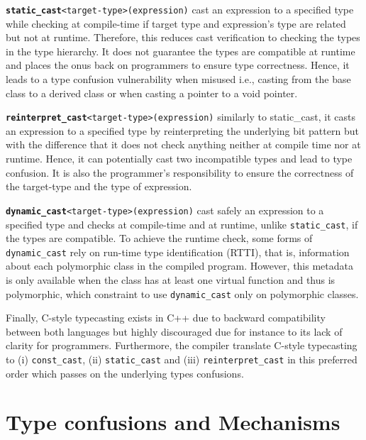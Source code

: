 \documentclass[a4paper,11pt,oneside]{report}
\begin{document}
\texttt{\textbf{static\_cast}<target-type>(expression)} cast an expression to a
specified type while checking at compile-time if target type and expression's 
type are related but not at runtime. Therefore, this
reduces cast verification to checking the types in the type hierarchy. It does
not guarantee the types are compatible at runtime and places the onus back on
programmers to ensure type correctness. Hence, it leads to a type confusion
vulnerability when misused i.e., casting from the base class to a derived class
or when casting a pointer to a void pointer.

\texttt{\textbf{reinterpret\_cast}<target-type>(expression)} similarly to
static\_cast, it casts an expression to a specified type by reinterpreting the
underlying bit pattern but with the difference that it does not check anything neither at
compile time nor at runtime. Hence, it can potentially cast two incompatible
types and lead to type confusion.  It is also the programmer's responsibility to
ensure the correctness of the target-type and the type of expression.

\texttt{\textbf{dynamic\_cast}<target-type>(expression)} cast safely an
expression to a specified type and checks at compile-time and at runtime, unlike
\texttt{static\_cast}, if the types are compatible. To achieve the runtime
check, some forms of \texttt{dynamic\_cast} rely on run-time type identification (RTTI), 
that is, information about each polymorphic class in the compiled program. 
However, this metadata is only available when the class has at least
one virtual function and thus is polymorphic, which constraint to use
\texttt{dynamic\_cast} only on polymorphic classes.

Finally, C-style typecasting exists in C++ due to backward compatibility between
both languages but highly discouraged due for instance to its lack of clarity
for programmers.  Furthermore, the compiler translate C-style typecasting to (i)
\texttt{const\_cast}, (ii) \texttt{static\_cast} and (iii)
\texttt{reinterpret\_cast} in this preferred order which passes on the
underlying types confusions.

\section{Type confusions and Mechanisms} \label{sec:cpp_mechanisms}
\end{document}
